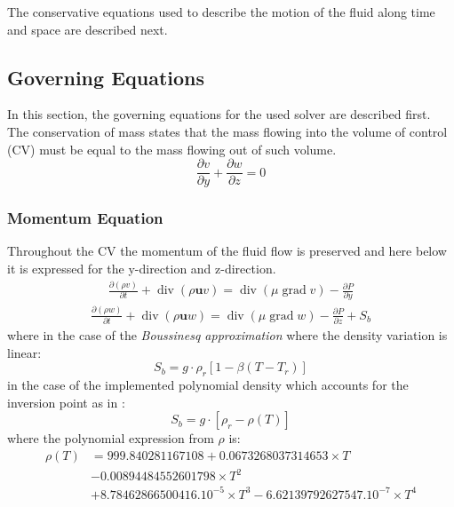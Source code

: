 The conservative equations used to describe the motion of the fluid along time and space are described next.
\subsection{Governing Equations}
In this section, the governing equations for the used solver are described first.
\newline
The conservation of mass states that the mass flowing into the volume of control (CV) must be equal to the mass flowing out of such volume. 
\begin{equation}
\frac{\partial v}{\partial y}+\frac{\partial w}{\partial z}=0
\label{3.5}
\end{equation}

\subsubsection{Momentum Equation}
Throughout the CV the momentum of the fluid flow is preserved and here below it is expressed for the y-direction and z-direction.
\begin{equation}
	\begin{aligned}
		\frac{\partial(\rho v)}{\partial t}+\operatorname{div}(\rho \mathbf{u} v)=\operatorname{div}(\mu \operatorname{grad} v)-\frac{\partial P}{\partial y}
	\end{aligned}
	\label{3.6}
\end{equation}
\begin{equation}
	\begin{aligned}
		\frac{\partial(\rho w)}{\partial t}+\operatorname{div}(\rho \mathbf{u} w)=\operatorname{div}(\mu \operatorname{grad} w)-\frac{\partial P}{\partial z}+S_{b}
	\end{aligned}
	\label{3.7}
\end{equation}
where in the case of the \textit{Boussinesq approximation} where the density variation is linear:
\begin{equation}
	S_{b} = g\cdot\rho_{r}[1-\beta(T-T_{r})]
	\label{3.8}
\end{equation}
in the case of the implemented polynomial density which accounts for the inversion point as in \cite{bourdillon_2016}:
\begin{equation}
S_{b} = g\cdot[\rho_{r}-\rho(T)]
\label{3.9}
\end{equation}
where the polynomial expression from $\rho$ is:
\begin{equation}
	\begin{aligned}
		\rho(T) &=999.840281167108+0.0673268037314653 \times T \\
		&-0.00894484552601798 \times T^{2} \\
		&+8.78462866500416 .10^{-5} \times T^{3} 
		-6.62139792627547 .10^{-7} \times T^{4}
	\end{aligned}
	\label{3.9}
\end{equation}
